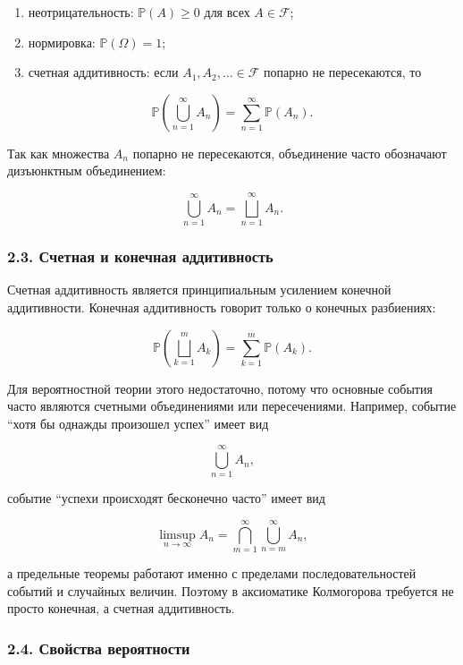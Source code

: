 \documentclass[
  11pt,
  a4paper,
]{article}
\providecommand{\tightlist}{%
  \setlength{\itemsep}{0pt}\setlength{\parskip}{0pt}}
\begin{document}
\begin{enumerate}
\def\labelenumi{\arabic{enumi}.}
\tightlist
\item
  неотрицательность: \(\mathbb P(A)\ge 0\) для всех \(A\in\mathcal F\);
\item
  нормировка: \(\mathbb P(\Omega)=1\);
\item
  счетная аддитивность: если \(A_1,A_2,\ldots\in\mathcal F\) попарно не
  пересекаются, то
\end{enumerate}

\[
\mathbb P\left(\bigcup_{n=1}^{\infty}A_n\right)
=
\sum_{n=1}^{\infty}\mathbb P(A_n).
\]

Так как множества \(A_n\) попарно не пересекаются, объединение часто
обозначают дизъюнктным объединением:

\[
\bigcup_{n=1}^{\infty}A_n=\bigsqcup_{n=1}^{\infty}A_n.
\]

\subsubsection{2.3. Счетная и конечная
аддитивность}\label{ux441ux447ux435ux442ux43dux430ux44f-ux438-ux43aux43eux43dux435ux447ux43dux430ux44f-ux430ux434ux434ux438ux442ux438ux432ux43dux43eux441ux442ux44c}

Счетная аддитивность является принципиальным усилением конечной
аддитивности. Конечная аддитивность говорит только о конечных
разбиениях:

\[
\mathbb P\left(\bigsqcup_{k=1}^m A_k\right)
=
\sum_{k=1}^m\mathbb P(A_k).
\]

Для вероятностной теории этого недостаточно, потому что основные события
часто являются счетными объединениями или пересечениями. Например,
событие ``хотя бы однажды произошел успех'' имеет вид

\[
\bigcup_{n=1}^{\infty}A_n,
\]

событие ``успехи происходят бесконечно часто'' имеет вид

\[
\limsup_{n\to\infty}A_n
=
\bigcap_{m=1}^{\infty}\bigcup_{n=m}^{\infty}A_n,
\]

а предельные теоремы работают именно с пределами последовательностей
событий и случайных величин. Поэтому в аксиоматике Колмогорова требуется
не просто конечная, а счетная аддитивность.

\subsubsection{2.4. Свойства
вероятности}\label{ux441ux432ux43eux439ux441ux442ux432ux430-ux432ux435ux440ux43eux44fux442ux43dux43eux441ux442ux438}
\end{document}
